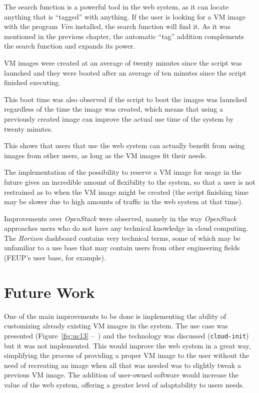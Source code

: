 The search function is a powerful tool in the web system, as it can locate anything that is ``tagged'' with anything. If the user is looking for a VM image with the program \textit{Vim} installed, the search function will find it. As it was mentioned in the previous chapter, the automatic ``tag'' addition complements the search function and expands its power.

VM images were created at an average of twenty minutes since the script was launched and they were booted after an average of ten minutes since the script finished executing.

This boot time was also observed if the script to boot the images was launched regardless of the time the image was created, which means that using a previously created image can improve the actual use time of the system by twenty minutes.

This shows that users that use the web system can actually benefit from using images from other users, as long as the VM images fit their needs.

The implementation of the possibility to reserve a VM image for usage in the future gives an incredible amount of flexibility to the system, so that a user is not restrained as to when the VM image might be created (the script finishing time may be slower due to high amounts of traffic in the web system at that time).

Improvements over \textit{OpenStack} were observed, namely in the way \textit{OpenStack} approaches users who do not have any technical knowledge in cloud computing. The \textit{Horizon} dashboard contains very technical terms, some of which may be unfamiliar to a use base that may contain users from other engineering fields (FEUP's user base, for example).

\section{Future Work}\label{sec:future-work}

One of the main improvements to be done is implementing the ability of customizing already existing VM images in the system. The use case was presented (Figure~\ref{fig:uc13} --~) and the technology was discussed (\texttt{cloud-init}) but it was not implemented. 
This would improve the web system in a great way, simplifying the process of providing a proper VM image to the user without the need of recreating an image when all that was needed was to slightly tweak a previous VM image. The addition of user-owned software would increase the value of the web system, offering a greater level of adaptability to users needs.

